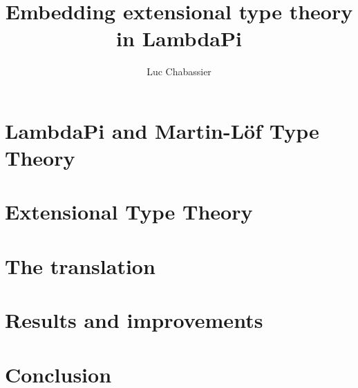 \documentclass[11pt]{article}
\title{Embedding extensional type theory in LambdaPi}
\author{Luc Chabassier}
\begin{document}
\frenchspacing

\maketitle
\tableofcontents



\section{LambdaPi and Martin-Löf Type Theory}\label{MLTT}


\section{Extensional Type Theory}\label{ETT}


\section{The translation}\label{translation}


\section{Results and improvements}\label{results}


\section{Conclusion}\label{conclusion}




\end{document}
